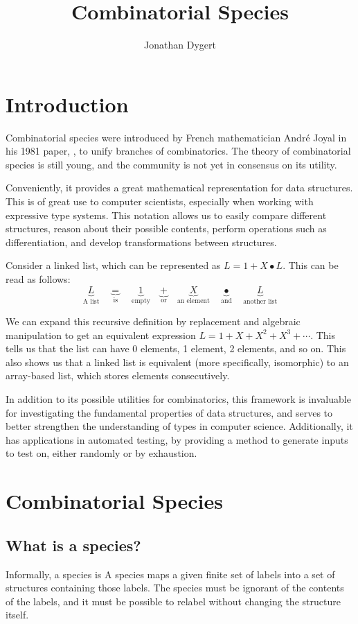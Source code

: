 \documentclass{article}
\title{Combinatorial Species}
\author{Jonathan Dygert}
\begin{document}
\maketitle

\section{Introduction}
Combinatorial species were introduced by French mathematician Andr\'e Joyal in his 1981 paper,
, to unify branches of combinatorics. The theory of combinatorial species is still
young, and the community is not yet in consensus on its utility.

Conveniently, it provides a great mathematical representation for data structures. This is of great
use to computer scientists, especially when working with expressive type systems. This notation
allows us to easily compare different structures, reason about their possible contents, perform
operations such as differentiation, and develop transformations between structures.

Consider a linked list, which can be represented as \( L = 1 + X \bullet L \). This can be read as
follows:
\[
  \underbrace{L}_\text{A list} \quad
  \underbrace{=}_\text{is} \quad
  \underbrace{1}_\text{empty} \quad
  \underbrace{+}_\text{or} \quad
  \underbrace{X}_\text{an element} \quad
  \underbrace{\bullet}_\text{and} \quad
  \underbrace{L}_\text{another list}
\]

We can expand this recursive definition by replacement and algebraic manipulation to get an
equivalent expression \( L = 1 + X + X^2 + X^3 + \cdots \). This tells us that the list can have 0
elements, 1 element, 2 elements, and so on. This also shows us that a linked list is equivalent
(more specifically, isomorphic) to an array-based list, which stores elements consecutively.

In addition to its possible utilities for combinatorics, this framework is invaluable for
investigating the fundamental properties of data structures, and serves to better strengthen the
understanding of types in computer science. Additionally, it has applications in automated testing,
by providing a method to generate inputs to test on, either randomly or by exhaustion.~\cite{yorgey}

\section{Combinatorial Species}
\subsection{What is a species?}
Informally, a species is  A species maps a given finite set of labels into a set
of structures containing those labels. The species must be ignorant of the contents of the labels,
and it must be possible to relabel without changing the structure itself.
\end{document}
